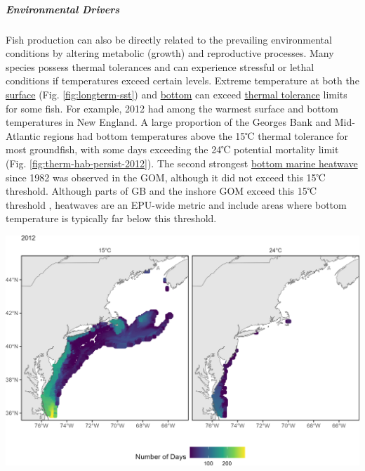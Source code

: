 \documentclass[
  10pt,
]{article}
\let\origfigure\figure
\let\endorigfigure\endfigure
\renewenvironment{figure}[1][2] {
    \expandafter\origfigure\expandafter[H]
} {
    \endorigfigure
}
\begin{document}
\hypertarget{environmental-drivers}{%
\subparagraph{Environmental Drivers}\label{environmental-drivers}}

Fish production can also be directly related to the prevailing environmental conditions by altering metabolic (growth) and reproductive processes. Many species possess thermal tolerances and can experience stressful or lethal conditions if temperatures exceed certain levels. Extreme temperature at both the \href{https://noaa-edab.github.io/catalog/sea-surface-temperature-anomaly.html}{surface} (Fig. \ref{fig:longterm-sst}) and \href{https://noaa-edab.github.io/catalog/bottom-temperature---seasonal-anomaly.html}{bottom} can exceed \href{https://noaa-edab.github.io/catalog/thermal-habitat-persistence.html}{thermal tolerance} limits for some fish. For example, 2012 had among the warmest surface and bottom temperatures in New England. A large proportion of the Georges Bank and Mid-Atlantic regions had bottom temperatures above the 15℃ thermal tolerance for most groundfish, with some days exceeding the 24℃ potential mortality limit (Fig. \ref{fig:therm-hab-persist-2012}). The second strongest \href{https://noaa-edab.github.io/catalog/marine-heatwaves---bottom.html}{bottom marine heatwave} since 1982 was observed in the GOM, although it did not exceed this 15℃ threshold. Although parts of GB and the inshore GOM exceed this 15℃ threshold , heatwaves are an EPU-wide metric and include areas where bottom temperature is typically far below this threshold.

\begin{figure}

{\centering \includegraphics[width=32.03in]{SOE-NEFMC_files/figure-latex/therm-hab-persist-2012-1} 

}

\caption{The number of days in 2012 where bottom temperature exceeds 15℃ (left) and 24℃ (right) based on the GLORYS 1/12 degree grid.}\label{fig:therm-hab-persist-2012}
\end{figure}
\end{document}
